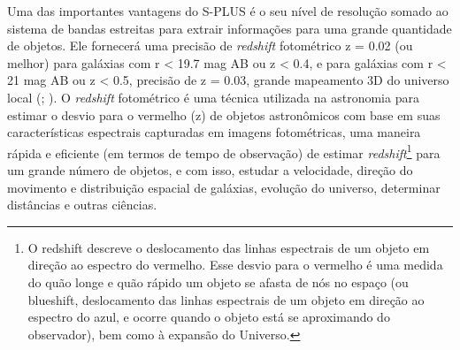 Uma das importantes vantagens do S-PLUS é o seu nível de resolução somado ao sistema de bandas estreitas para extrair informações para uma grande quantidade de objetos. Ele fornecerá uma precisão de \emph{redshift} fotométrico z = 0.02 (ou melhor) para galáxias com r < 19.7 mag AB ou z < 0.4, e para galáxias com r < 21 mag AB ou z < 0.5, precisão de z = 0.03, grande mapeamento 3D do universo local (; ). O \emph{redshift} fotométrico é uma técnica utilizada na astronomia para estimar o desvio para o vermelho (z) de objetos astronômicos com base em suas características espectrais capturadas em imagens fotométricas, uma maneira rápida e eficiente (em termos de tempo de observação) de estimar \emph{redshift}\footnote{O redshift descreve o deslocamento das linhas espectrais de um objeto em direção ao espectro do vermelho. Esse desvio para o vermelho é uma medida do quão longe e quão rápido um objeto se afasta de nós no espaço (ou blueshift, deslocamento das linhas espectrais de um objeto em direção ao espectro do azul, e ocorre quando o objeto está se aproximando do observador), bem como à expansão do Universo.} para um grande número de objetos, e com isso, estudar a velocidade, direção do movimento e distribuição espacial de galáxias, evolução do universo, determinar distâncias e outras ciências.

